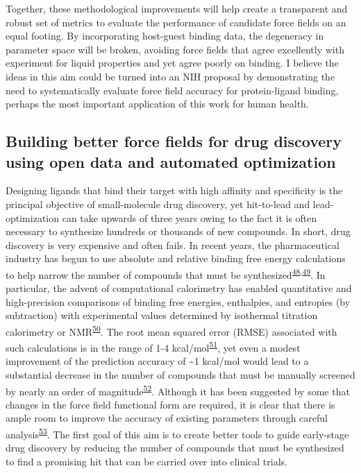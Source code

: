 \documentclass[11pt,notitlepage]{article}
\begin{document}
Together, these methodological improvements will help create a
transparent and robust set of metrics to evaluate the performance of
candidate force fields on an equal footing. By incorporating host-guest
binding data, the degeneracy in parameter space will be broken, avoiding
force fields that agree excellently with experiment for liquid
properties and yet agree poorly on binding. I believe the ideas in this
aim could be turned into an NIH proposal by demonstrating the need to
systematically evaluate force field accuracy for protein-ligand binding,
perhaps the most important application of this work for human health.

\hypertarget{building-better-force-fields-for-drug-discovery-using-open-data-and-automated-optimization-1}{%
\subsection{Building better force fields for drug discovery using open
data and automated
optimization}\label{building-better-force-fields-for-drug-discovery-using-open-data-and-automated-optimization-1}}

Designing ligands that bind their target with high affinity and
specificity is the principal objective of small-molecule drug discovery,
yet hit-to-lead and lead-optimization can take upwards of three years
owing to the fact it is often necessary to synthesize hundreds or
thousands of new compounds. In short, drug discovery is very expensive
and often fails. In recent years, the pharmaceutical industry has begun
to use absolute and relative binding free energy calculations to help
narrow the number of compounds that must be
synthesized\textsuperscript{\protect\hyperlink{ref-1FiDpP1LR}{48},\protect\hyperlink{ref-1BwXH3GFO}{49}}.
In particular, the advent of computational calorimetry has enabled
quantitative and high-precision comparisons of binding free energies,
enthalpies, and entropies (by subtraction) with experimental values
determined by isothermal titration calorimetry or
NMR\textsuperscript{\protect\hyperlink{ref-1935a9V0d}{50}}. The root
mean squared error (RMSE) associated with such calculations is in the
range of 1-4
kcal/mol\textsuperscript{\protect\hyperlink{ref-LWd10vQy}{51}}, yet even
a modest improvement of the prediction accuracy of \textasciitilde{}1
kcal/mol would lead to a substantial decrease in the number of compounds
that must be manually screened by nearly an order of
magnitude\textsuperscript{\protect\hyperlink{ref-fC0t6Cy1}{52}}.
Although it has been suggested by some that changes in the force field
functional form are required, it is clear that there is ample room to
improve the accuracy of existing parameters through careful
analysis\textsuperscript{\protect\hyperlink{ref-LOjcxYqt}{53}}. The
first goal of this aim is to create better tools to guide early-stage
drug discovery by reducing the number of compounds that must be
synthesized to find a promising hit that can be carried over into
clinical trials.
\end{document}
